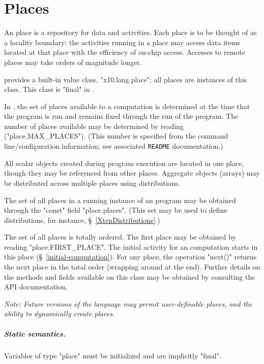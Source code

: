 \chapter{Places}\label{XtenPlaces}
\cbstart 
An \Xten{} place is a repository for data and activities. Each place
is to be thought of as a locality boundary: the activities running in
a place may access data items located at that place with the
efficiency of on-chip access. Accesses to remote places may take
orders of magnitude longer.

{}\Xten{} provides a built-in value class, \xcd"x10.lang.place"; all
places are instances of this class.  This class is \xcd"final" in
{}\XtenCurrVer.

In \XtenCurrVer{}, the set of places available to a computation is
determined at the time that the program is run and remains fixed
through the run of the program. The number of places available 
may be determined by reading (\xcd"place.MAX_PLACES"). (This number
is specified from the command line/configuration information; 
see associated {\tt README} documentation.)

All scalar objects created during program execution are located in one
place, though they may be referenced from other places. Aggregate
objects (arrays) may be distributed across multiple places using
distributions.

The set of all places in a running instance of an \Xten{} program may
be obtained through the \xcd"const" field \xcd"place.places".  (This
set may be used to define distributions, for instance,
\S~\ref{XtenDistributions}.) 


The set of all places is totally ordered.  The first place may be
obtained by reading \xcd"place.FIRST_PLACE". The initial activity for
an \Xten{} computation starts in this place
(\S~\ref{initial-computation}). For any place, the operation \xcd"next()"
returns the next place in the total order (wrapping around at the
end). Further details on the methods and fields available on this
class may be obtained by consulting the API documentation.

{\em Note: Future versions of the language may permit user-definable
places, and the ability to dynamically create places. }

\paragraph{Static semantics.}
Variables of type \xcd"place" must be initialized and are implicitly
\xcd"final".  

